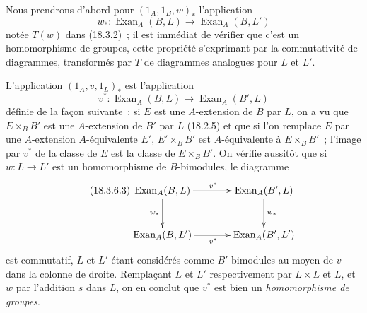 \begin{env}[18.3.6]
\label{0.18.3.6-fr}
Nous prendrons d'abord pour $(1_A,1_B,w)_*$ l'application
\begin{equation}
\label{0.18.3.6.1-fr}
\tag{18.3.6.1}
  w_*:\operatorname{Exan}_A(B,L)\longrightarrow
  \operatorname{Exan}_A(B,L')
\end{equation}
notée $T(w)$ dans (18.3.2)~; il est immédiat de vérifier que c'est un
homomorphisme de groupes, cette propriété s'exprimant par la commutativité de
diagrammes, transformés par $T$ de diagrammes analogues pour $L$ et $L'$.

L'application $(1_A,v,1_L)_*$ est l'application
\begin{equation}
\label{0.18.3.6.2-fr}
\tag{18.3.6.2}
  v^*:\operatorname{Exan}_A(B,L)\longrightarrow
  \operatorname{Exan}_A(B',L)
\end{equation}
définie de la façon suivante~: si $E$ est une $A$-extension de $B$ par $L$,
on a vu que $E\times_BB'$ est une $A$-extension de $B'$ par $L$ (18.2.5) et
que si l'on remplace $E$ par une $A$-extension $A$-équivalente $E'$,
$E'\times_BB'$ est $A$-équivalente à $E\times_BB'$~; l'image par $v^*$ de la
classe de $E$ est la classe de $E\times_BB'$. On vérifie aussitôt que si
$w:L\to L'$ est un homomorphisme de $B$-bimodules, le diagramme
\begin{equation}
\label{0.18.3.6.3-fr}
\tag{18.3.6.3}
  \xymatrix@C=3pc@R=2.4pc{
    \operatorname{Exan}_A(B,L)\ar[r]^{v^*}\ar[d]_{w_*}
      & \operatorname{Exan}_A(B',L)\ar[d]^{w_*}\\
    \operatorname{Exan}_A(B,L')\ar[r]_{v^*}
      & \operatorname{Exan}_A(B',L')
  }
\end{equation}
est commutatif, $L$ et $L'$ étant considérés comme $B'$-bimodules au moyen
de $v$ dans la colonne de droite. Remplaçant $L$ et $L'$ respectivement par
$L\times L$ et $L$, et $w$ par l'addition $s$ dans $L$, on en conclut que
$v^*$ est bien un \emph{homomorphisme de groupes}.
\end{env}


